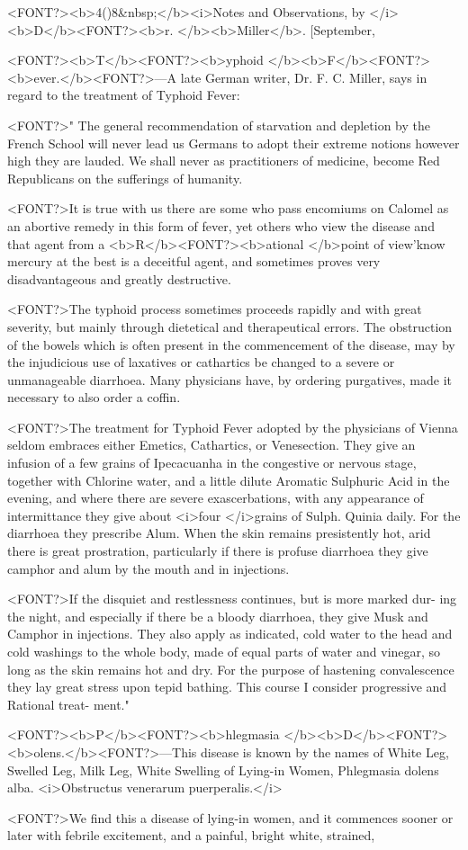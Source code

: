 <FONT?><b>4()8&nbsp;</b><i>Notes and Observations, by </i><b>D</b><FONT?><b>r. </b><b>Miller</b>. [September,

<FONT?><b>T</b><FONT?><b>yphoid </b><b>F</b><FONT?><b>ever.</b><FONT?>---A late German writer, Dr. F. C. Miller, says in
regard to the treatment of Typhoid Fever:

<FONT?>" The general recommendation of starvation and depletion by the
French School will never lead us Germans to adopt their extreme notions
however high they are lauded. We shall never as practitioners of
medicine, become Red Republicans on the sufferings of humanity.

<FONT?>It is true with us there are some who pass encomiums on Calomel as an
abortive remedy in this form of fever, yet others who view the disease
and that agent from a <b>R</b><FONT?><b>ational </b>point of view'know mercury at the
best is a deceitful agent, and sometimes proves very disadvantageous
and greatly destructive.

<FONT?>The typhoid process sometimes proceeds rapidly and with great
severity, but mainly through dietetical and therapeutical errors. The
obstruction of the bowels which is often present in the commencement
of the disease, may by the injudicious use of laxatives or cathartics
be changed to a severe or unmanageable diarrhoea. Many physicians
have, by ordering purgatives, made it necessary to also order a coffin.

<FONT?>The treatment for Typhoid Fever adopted by the physicians of
Vienna seldom embraces either Emetics, Cathartics, or Venesection.
They give an infusion of a few grains of Ipecacuanha in the congestive
or nervous stage, together with Chlorine water, and a little dilute
Aromatic Sulphuric Acid in the evening, and where there are severe
exascerbations, with any appearance of intermittance they give about
<i>four </i>grains of Sulph. Quinia daily. For the diarrhoea they prescribe
Alum. When the skin remains presistently hot, arid there is great
prostration, particularly if there is profuse diarrhoea they give camphor
and alum by the mouth and in injections.

<FONT?>If the disquiet and restlessness continues, but is more marked dur-
ing the night, and especially if there be a bloody diarrhoea, they give
Musk and Camphor in injections. They also apply as indicated, cold
water to the head and cold washings to the whole body, made of equal
parts of water and vinegar, so long as the skin remains hot and dry.
For the purpose of hastening convalescence they lay great stress upon
tepid bathing. This course I consider progressive and Rational treat-
ment."

<FONT?><b>P</b><FONT?><b>hlegmasia </b><b>D</b><FONT?><b>olens.</b><FONT?>---This disease is known by the names of White
Leg, Swelled Leg, Milk Leg, White Swelling of Lying-in Women,
Phlegmasia dolens alba. <i>Obstructus venerarum puerperalis.</i>

<FONT?>We find this a disease of lying-in women, and it commences sooner
or later with febrile excitement, and a painful, bright white, strained,\endinput
